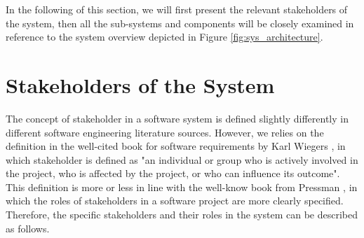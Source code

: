 In the following of this section, we will first present the relevant stakeholders of the system, then all the sub-systems and components will be closely examined in reference to the system overview depicted in Figure \ref{fig:sys_architecture}.


\section{Stakeholders of the System} \label{sec:stakeholders}

The concept of stakeholder in a software system is defined slightly differently in different software engineering literature sources. However, we relies on the definition in the well-cited book for software requirements by Karl Wiegers \cite{wiegers2013software}, in which stakeholder is defined as "an individual or group who is actively involved in the project, who is affected by the project, or who can influence its outcome". This definition is more or less in line with the well-know book from Pressman \cite{pressman2005software}, in which the roles of stakeholders in a software project are more clearly specified. Therefore, the specific stakeholders and their roles in the system can be described as follows.

